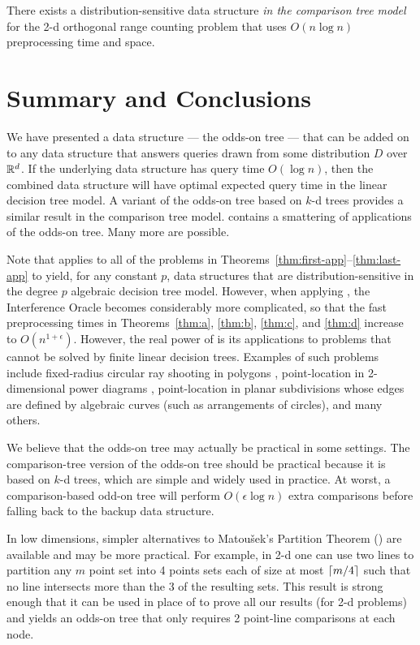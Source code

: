 \documentclass{patmorin}
\begin{document}
\begin{thm}
  There exists a distribution-sensitive data structure \emph{in the
  comparison tree model} for the 2-d orthogonal range counting problem
  that uses $O(n\log n)$ preprocessing time and space.
\end{thm}

\section{Summary and Conclusions}

We have presented a data structure --- the odds-on tree --- that can
be added on to any data structure that answers queries drawn from some
distribution $D$ over $\mathbb{R}^d$.  If the underlying data structure has query
time $O(\log n)$, then the combined data structure will have optimal
expected query time in the linear decision tree model.  A variant of
the odds-on tree based on $k$-d trees provides a similar result in the
comparison tree model.   contains a smattering of
applications of the odds-on tree.  Many more are possible.

Note that  applies to all of the problems
in Theorems~\ref{thm:first-app}--\ref{thm:last-app} to yield, for
any constant $p$, data structures that are distribution-sensitive
in the degree $p$ algebraic decision tree model.  However, when
applying , the Interference Oracle becomes
considerably more complicated, so that the fast preprocessing times in
Theorems~\ref{thm:a}, \ref{thm:b}, \ref{thm:c}, and \ref{thm:d} increase
to $O(n^{1+\epsilon})$.
However, the real power of  is its applications
to problems that cannot be solved by finite linear decision trees.
Examples of such problems include fixed-radius circular ray shooting in
polygons \cite{cceo04}, point-location in 2-dimensional power diagrams
\cite{a87}, point-location in planar subdivisions whose edges are defined
by algebraic curves (such as arrangements of circles), and many others.

We believe that the odds-on tree may actually be practical in some settings.
The comparison-tree version of the odds-on tree should be practical
because it is based on $k$-d trees, which are simple and widely used
in practice. At worst, a comparison-based odd-on tree will perform
$O(\epsilon\log n)$ extra comparisons before falling back to the backup
data structure.

In low dimensions, simpler alternatives to Matou\v{s}ek's Partition
Theorem () are available and may be more
practical.  For example, in 2-d one can use two lines to partition any $m$
point set into 4 points sets each of size at most ${\left\lceil m/4 \right\rceil}$ such that
no line intersects more than the 3 of the resulting sets. This result is
strong enough that it can be used in place of 
to prove all our results (for 2-d problems) and yields an odds-on tree
that only requires 2 point-line comparisons at each node.
\end{document}
